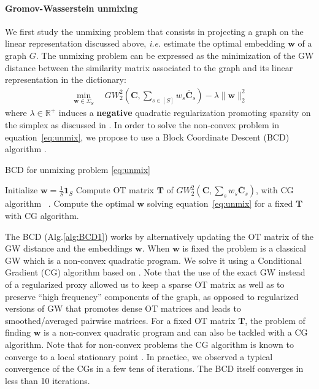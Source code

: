 \documentclass{article}
\def\eqref#1{equation~\ref{#1}}
\def\vw{{\bm{w}}}
\def\mC{{\bm{C}}}
\def\mT{{\bm{T}}}
\begin{document}
	\paragraph{Gromov-Wasserstein unmixing}
	We first study the unmixing problem that consists in projecting a graph on the
	linear representation discussed above, \emph{i.e.} estimate the optimal
	embedding $\vw$ of a graph $G$.
	The unmixing problem can be expressed as the minimization of the GW
	distance between the similarity matrix associated to the graph and its linear representation in the dictionary:
	\begin{align}   
	\min_{\vw \in \Sigma_S}\quad GW^2_2\left(\mC, \sum_{s \in [S]} w_s \overline{\mC}_s\right) - \lambda \|\vw\|^2_2 \label{eq:unmix}
	\end{align}
	where $\lambda \in \mathbb{R}^{+}$ induces a \textbf{negative} quadratic regularization promoting sparsity on the
	simplex as discussed in \citet{li2016methods}. In order to solve the non-convex problem in \eqref{eq:unmix}, we propose to
	use a Block Coordinate Descent (BCD) algorithm \citep{tseng2001convergence}. 
	\begin{algorithm}[t]
		\caption{BCD for unmixing problem \ref{eq:unmix}}
		\label{alg:BCD1}
		\begin{algorithmic}[1]
			\STATE Initialize $\vw=\frac{1}{S}\mathbf{1}_S$
			\REPEAT
			\STATE Compute OT matrix $\mT$ of $GW_2^2(\mC, \sum_s w_s \overline{\mC}_s)$, with CG algorithm ~\citep[Alg.1 \& 2]{vayer-fused-2018}.
			\STATE Compute the optimal $\vw$ solving \eqref{eq:unmix} for a fixed
			$\mT$ with CG algorithm. 
		\end{algorithmic}
	\end{algorithm}
	
	The BCD (Alg.\ref{alg:BCD1}) works by alternatively updating the OT matrix of the GW distance and the embeddings $\vw$. When $\vw$ is fixed the problem
	is a classical GW  {which is a non-convex quadratic program. We 
		solve it} using a Conditional Gradient (CG) algorithm
	\citep{jaggi2013revisiting} based on \citep{vayer-optimal-nodate}.  Note that the use of the exact GW instead of a regularized
	proxy allowed us to keep a sparse OT matrix as well as
	to  preserve ``high frequency'' components of the graph, as opposed to
	regularized versions of GW \citep{peyre2016gromov,solomon_entropic_2016,xu2019gromov} that promotes dense OT matrices
	and leads to smoothed/averaged pairwise matrices. For a fixed OT matrix $\mT$, the problem of finding $\vw$ is a non-convex
	quadratic program and can also be tackled with a CG algorithm.  Note that for non-convex
	problems the CG algorithm is
	known to converge to a local
	stationary point \citep{lacoste-julien-convergence-2016}. In practice, we
	observed a typical convergence of the CGs in a few tens of iterations. The BCD
	itself converges in less than 10 iterations.
\end{document}
